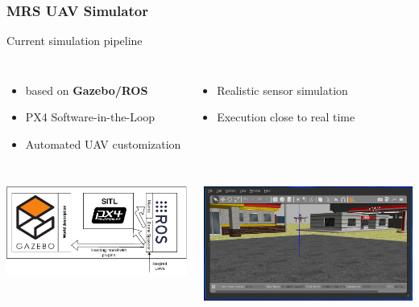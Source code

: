 \documentclass[aspectratio=169]{beamer}
\begin{document}
\begin{frame}
\frametitle{MRS UAV Simulator}

\begin{block}{Current simulation pipeline}

  \vspace{-1em}

  \begin{columns}[c]

  \begin{itemize}
    \item based on \textbf{Gazebo/ROS}
    \item PX4 Software-in-the-Loop
    \item Automated UAV customization
  \end{itemize}

  \begin{itemize}
    \item Realistic sensor simulation
    \item Execution close to real time
  \end{itemize}

  \end{columns}

\end{block}

\begin{columns}[c]

\includegraphics[width=1.0\textwidth]{./fig/gazebo_mrs_5.pdf}

\includegraphics[width=1.0\textwidth]{./fig/gazebo.jpg}

\end{columns}

\end{frame}
\end{document}
